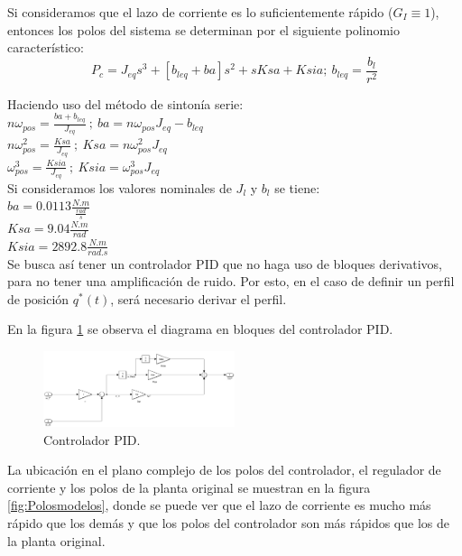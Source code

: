 \documentclass[10pt]{article}
\begin{document}
	Si consideramos que el lazo de corriente es lo suficientemente rápido ($G_{I}\equiv 1$), entonces los polos del sistema se determinan por el siguiente polinomio característico:
	\begin{equation}
	P_{c}=J_{eq}s^{3}+[b_{leq}+ba]s^{2}+sKsa+Ksia; \ b_{leq}= \frac{b_{l}}{r^{2}} 
	\label{eq:2.1.2.q.7}
	\end{equation}
	
	Haciendo uso del método de sintonía serie:\\
	$ n\omega_{pos}=\frac{ba+b_{leq}}{J_{eq}} \ ; \ ba=n\omega_{pos}J_{eq}-b_{leq}$ \\
	$ n\omega^{2}_{pos}=\frac{Ksa}{J_{eq}} \ ; \  Ksa=n\omega^{2}_{pos}J_{eq} $\\
	$ \omega^{3}_{pos}=\frac{Ksia}{J_{eq}} \ ; \  Ksia=\omega^{3}_{pos}J_{eq} $\\
	
	Si consideramos los valores nominales de $J_{l}$ y $b_{l}$ se tiene:\\
	$ba=0.0113 \frac{N.m}{\frac{rad}{s}}$\\
	$Ksa=9.04 \frac{N.m}{rad}$\\
	$Ksia=2892.8 \frac{N.m}{rad.s}$\\
	
	Se busca así tener un controlador PID que no haga uso de bloques derivativos, para no tener una amplificación de ruido. Por esto, en el caso de definir un perfil de posición $q^{*}(t)$, será necesario derivar el perfil.
	
	En la figura \ref{fig:controladorPID} se observa el diagrama en bloques del controlador PID.
		 	\begin{figure}[h!]
	\centering
	\includegraphics[width=0.5\textwidth]{controladorPID.png}
	\caption{\label{fig:controladorPID}Controlador PID.}
	\end{figure}
	\newpage
	La ubicación en el plano complejo de los polos del controlador, el regulador de corriente y los polos de la planta original se muestran en la figura \ref{fig:Polosmodelos}, donde se puede ver que el lazo de corriente es mucho más rápido que los demás y que los polos del controlador son más rápidos que los de la planta original.
	
\end{document}
